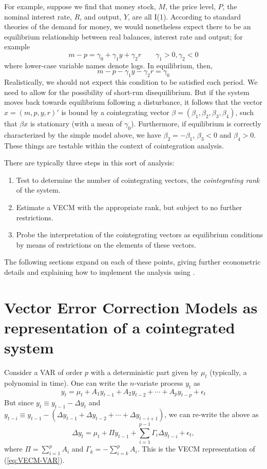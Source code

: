For example, suppose we find that money stock, $M$, the price level,
$P$, the nominal interest rate, $R$, and output, $Y$, are all I(1).
According to standard theories of the demand for money, we would
nonetheless expect there to be an equilibrium relationship between
real balances, interest rate and output; for example
\[
m - p = \gamma_0 + \gamma_1 y + \gamma_2 r \qquad \gamma_1 > 0,
\gamma_2 < 0
\]
where lower-case variable names denote logs.  In equilibrium, then,
\[
m - p - \gamma_1 y - \gamma_2 r = \gamma_0
\]
Realistically, we should not expect this condition to be satisfied
each period.  We need to allow for the possibility of short-run
disequilibrium.  But if the system moves back towards equilibrium
following a disturbance, it follows that the vector $x = (m, p, y,
r)'$ is bound by a cointegrating vector $\beta = (\beta_1, \beta_2,
\beta_3, \beta_4)$, such that $\beta x$ is stationary (with a mean of
$\gamma_0$).  Furthermore, if equilibrium is correctly characterized
by the simple model above, we have $\beta_2 = -\beta_1$, $\beta_3 < 0$
and $\beta_4 > 0$.  These things are testable within the context of
cointegration analysis.

There are typically three steps in this sort of analysis:
\begin{enumerate}
\item Test to determine the number of cointegrating vectors, the 
  \emph{cointegrating rank} of the system.
\item Estimate a VECM with the appropriate rank, but subject to no
  further restrictions.
\item Probe the interpretation of the cointegrating vectors as
  equilibrium conditions by means of restrictions on the elements
  of these vectors.
\end{enumerate}

The following sections expand on each of these points, giving further
econometric details and explaining how to implement the analysis using
.


\section{Vector Error Correction Models as representation of a
  cointegrated system}
\label{sec:VECM-rep}

Consider a VAR of order $p$ with a deterministic part given by $\mu_t$
(typically, a polynomial in time). One can write the $n$-variate
process $y_t$ as
\begin{equation}
  \label{eq:VECM-VAR}
  y_t = \mu_t + A_1 y_{t-1} + A_2 y_{t-2} + \cdots + A_p y_{t-p} +
  \epsilon_t 
\end{equation}
But since $y_t \equiv y_{t-1} - \Delta y_t$ and $y_{t-i} \equiv
y_{t-1} - (\Delta y_{t-1} + \Delta y_{t-2} + \cdots + \Delta
y_{t-i+1})$, we can re-write the above as
\begin{equation}
  \label{eq:VECM}
  \Delta y_t = \mu_t + \Pi y_{t-1} + \sum_{i=1}^{p-1} \Gamma_i \Delta
  y_{t-i} + \epsilon_t ,
\end{equation}
where $\Pi = \sum_{i=1}^p A_i$ and $\Gamma_k = -\sum_{i=k}^p A_i$.
This is the VECM representation of (\ref{eq:VECM-VAR}).

